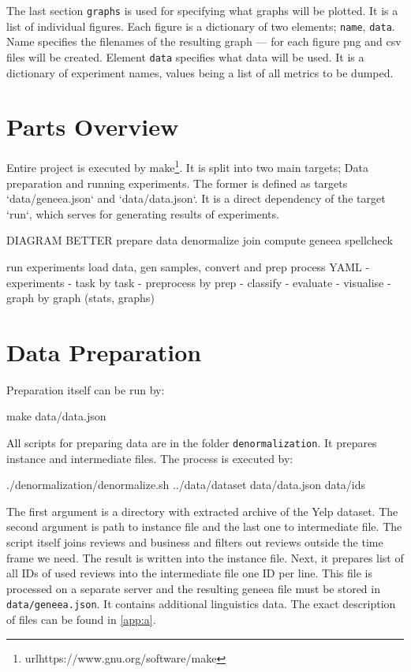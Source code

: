 The last section \texttt{graphs} is used for specifying what graphs will be plotted.
It is a list of individual figures.
Each figure is a dictionary of two elements; \texttt{name}, \texttt{data}.
Name specifies the filenames of the resulting graph ---
for each figure png and csv files will be created.
Element \texttt{data} specifies what data will be used.
It is a dictionary of experiment names, values being a list of all metrics to be dumped.

\section{Parts Overview}

Entire project is executed by make\footnote{url{https://www.gnu.org/software/make}}.
It is split into two main targets;
Data preparation and running experiments.
The former is defined as targets `data/geneea.json` and `data/data.json`.
It is a direct dependency of the target `run`, which serves for generating results
of experiments.

\begin{code}
DIAGRAM BETTER
prepare data
	denormalize
	join
	compute geneea
	spellcheck

run experiments
	load data, gen samples, convert and prep
	process YAML
		- experiments
			- task by task
				- preprocess by prep
				- classify
				- evaluate
		- visualise
			- graph by graph (stats, graphs)
\end{code}


\section{Data Preparation}

Preparation itself can be run by:

\begin{code}
make data/data.json
\end{code}

All scripts for preparing data are in the folder \texttt{denormalization}.
It prepares instance and intermediate files.
The process is executed by:

\begin{code}
./denormalization/denormalize.sh ../data/dataset data/data.json data/ids
\end{code}

The first argument is a directory with extracted archive of the Yelp dataset.
The second argument is path to instance file and the last one to intermediate file.
The script itself joins reviews and business
and filters out reviews outside the time frame we need.
The result is written into the instance file.
Next, it prepares list of all IDs of used reviews into the intermediate file one ID per line.
This file is processed on a separate server and the resulting geneea file must be stored
in \texttt{data/geneea.json}.
It contains additional linguistics data.
The exact description of files can be found in \autoref{app:a}.


